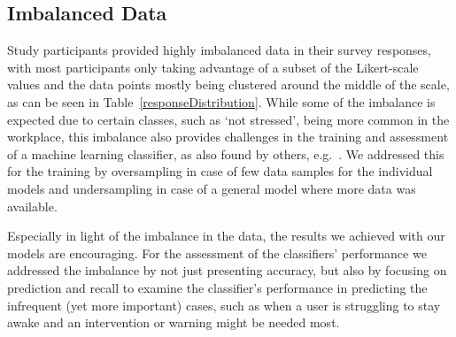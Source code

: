 \subsection{Imbalanced Data}
Study participants provided highly
imbalanced data in their survey responses, with most participants only
taking advantage of a subset of the Likert-scale values and the data
points mostly being clustered around the middle of the scale, as can
be seen in Table~\ref{responseDistribution}. While some of the
imbalance is expected due to certain classes, such as `not stressed',
being more common in the workplace, this imbalance also provides
challenges in the training and assessment of a machine learning
classifier, as also found by others, e.g.~\cite{Exler16}. We addressed
this for the training by oversampling in case of few data samples for
the individual models and undersampling in case of a general model
where more data was available. 

Especially in light of the imbalance
in the data, the results we achieved with our models are
encouraging. For the assessment of the classifiers' performance we
addressed the imbalance by not just presenting accuracy, but also by
focusing on prediction and recall to examine the classifier's
performance in predicting the infrequent (yet more important) cases,
such as when a user is struggling to stay awake and an intervention or
warning might be needed most.

